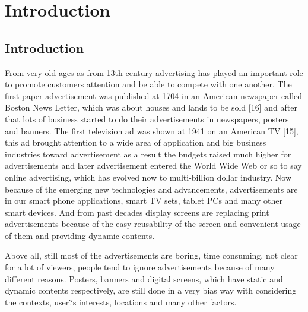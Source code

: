 
\chapter{Introduction} %

\label{Chapter1} %
\newpage


\newcommand{\keyword}[1]{\textbf{#1}}
\newcommand{\tabhead}[1]{\textbf{#1}}
\newcommand{\code}[1]{\texttt{#1}}
\newcommand{\file}[1]{\texttt{\bfseries#1}}
\newcommand{\option}[1]{\texttt{\itshape#1}}

\section{Introduction}
From very old ages as from 13th century advertising has played an important role to promote customers attention and be able to compete with one another, The first paper advertisement was published at 1704 in an American newspaper called Boston News Letter, which was about houses and lands to be sold [16] and after that lots of business started to do their advertisements in newspapers, posters and banners. The first television ad was shown at 1941 on an American TV [15], this ad brought attention to a wide area of application and big business industries toward advertisement as a result the budgets raised much higher for advertisements and later advertisement entered the World Wide Web or so to say online advertising, which has evolved now to multi-billion dollar industry. Now because of the emerging new technologies and advancements, advertisements are in our smart phone applications, smart TV sets, tablet PCs and many other smart devices. And from past decades display screens are replacing print advertisements because of the easy reusability of the screen and convenient usage of them and providing dynamic contents.

Above all, still most of the advertisements are boring, time consuming, not clear for a lot of viewers, people tend to ignore advertisements because of many different reasons. Posters, banners and digital screens, which have static and dynamic contents respectively, are still done in a very bias way with considering the contexts, user?s interests, locations and many other factors. 

